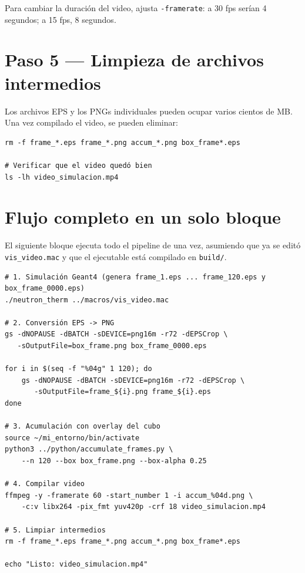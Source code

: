 \documentclass[11pt,a4paper]{article}
\begin{document}
Para cambiar la duración del video, ajusta \texttt{-framerate}:
a 30 fps serían 4 segundos; a 15 fps, 8 segundos.

\section{Paso 5 — Limpieza de archivos intermedios}

Los archivos EPS y los PNGs individuales pueden ocupar varios cientos de MB.
Una vez compilado el video, se pueden eliminar:

\begin{lstlisting}[style=console, caption={Limpieza — desde build/}]
rm -f frame_*.eps frame_*.png accum_*.png box_frame*.eps

# Verificar que el video quedó bien
ls -lh video_simulacion.mp4
\end{lstlisting}

\section{Flujo completo en un solo bloque}

El siguiente bloque ejecuta todo el pipeline de una vez, asumiendo que
ya se editó \texttt{vis\_video.mac} y que el ejecutable está compilado en \texttt{build/}.

\begin{lstlisting}[style=console, caption={Pipeline completo — desde build/}]
# 1. Simulación Geant4 (genera frame_1.eps ... frame_120.eps y box_frame_0000.eps)
./neutron_therm ../macros/vis_video.mac

# 2. Conversión EPS -> PNG
gs -dNOPAUSE -dBATCH -sDEVICE=png16m -r72 -dEPSCrop \
   -sOutputFile=box_frame.png box_frame_0000.eps

for i in $(seq -f "%04g" 1 120); do
    gs -dNOPAUSE -dBATCH -sDEVICE=png16m -r72 -dEPSCrop \
       -sOutputFile=frame_${i}.png frame_${i}.eps
done

# 3. Acumulación con overlay del cubo
source ~/mi_entorno/bin/activate
python3 ../python/accumulate_frames.py \
    --n 120 --box box_frame.png --box-alpha 0.25

# 4. Compilar video
ffmpeg -y -framerate 60 -start_number 1 -i accum_%04d.png \
    -c:v libx264 -pix_fmt yuv420p -crf 18 video_simulacion.mp4

# 5. Limpiar intermedios
rm -f frame_*.eps frame_*.png accum_*.png box_frame*.eps

echo "Listo: video_simulacion.mp4"
\end{lstlisting}
\end{document}
